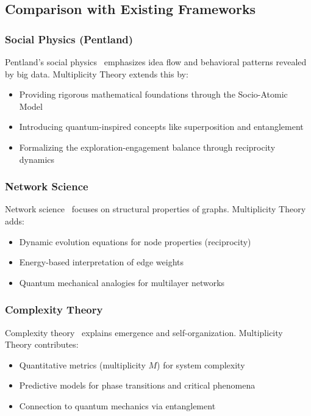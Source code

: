 \documentclass[11pt,a4paper]{article}
\begin{document}
\subsection{Comparison with Existing Frameworks}

\subsubsection{Social Physics (Pentland)}

Pentland's social physics~\cite{pentland2014} emphasizes idea flow and behavioral patterns revealed by big data. Multiplicity Theory extends this by:
\begin{itemize}
    \item Providing rigorous mathematical foundations through the Socio-Atomic Model
    \item Introducing quantum-inspired concepts like superposition and entanglement
    \item Formalizing the exploration-engagement balance through reciprocity dynamics
\end{itemize}

\subsubsection{Network Science}

Network science~\cite{barabasi2016,newman2010} focuses on structural properties of graphs. Multiplicity Theory adds:
\begin{itemize}
    \item Dynamic evolution equations for node properties (reciprocity)
    \item Energy-based interpretation of edge weights
    \item Quantum mechanical analogies for multilayer networks
\end{itemize}

\subsubsection{Complexity Theory}

Complexity theory~\cite{mitchell2009} explains emergence and self-organization. Multiplicity Theory contributes:
\begin{itemize}
    \item Quantitative metrics (multiplicity $M$) for system complexity
    \item Predictive models for phase transitions and critical phenomena
    \item Connection to quantum mechanics via entanglement
\end{itemize}
\end{document}
